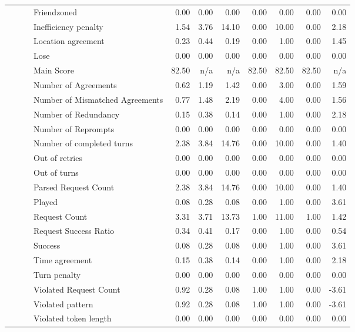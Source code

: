 \begin{tabular}{llllrrrrrrr}
 &  &  & Friendzoned & 0.00 & 0.00 & 0.00 & 0.00 & 0.00 & 0.00 & 0.00 \\
 &  &  & Inefficiency penalty & 1.54 & 3.76 & 14.10 & 0.00 & 10.00 & 0.00 & 2.18 \\
 &  &  & Location agreement & 0.23 & 0.44 & 0.19 & 0.00 & 1.00 & 0.00 & 1.45 \\
 &  &  & Lose & 0.00 & 0.00 & 0.00 & 0.00 & 0.00 & 0.00 & 0.00 \\
 &  &  & Main Score & 82.50 & n/a & n/a & 82.50 & 82.50 & 82.50 & n/a \\
 &  &  & Number of Agreements & 0.62 & 1.19 & 1.42 & 0.00 & 3.00 & 0.00 & 1.59 \\
 &  &  & Number of Mismatched Agreements & 0.77 & 1.48 & 2.19 & 0.00 & 4.00 & 0.00 & 1.56 \\
 &  &  & Number of Redundancy & 0.15 & 0.38 & 0.14 & 0.00 & 1.00 & 0.00 & 2.18 \\
 &  &  & Number of Reprompts & 0.00 & 0.00 & 0.00 & 0.00 & 0.00 & 0.00 & 0.00 \\
 &  &  & Number of completed turns & 2.38 & 3.84 & 14.76 & 0.00 & 10.00 & 0.00 & 1.40 \\
 &  &  & Out of retries & 0.00 & 0.00 & 0.00 & 0.00 & 0.00 & 0.00 & 0.00 \\
 &  &  & Out of turns & 0.00 & 0.00 & 0.00 & 0.00 & 0.00 & 0.00 & 0.00 \\
 &  &  & Parsed Request Count & 2.38 & 3.84 & 14.76 & 0.00 & 10.00 & 0.00 & 1.40 \\
 &  &  & Played & 0.08 & 0.28 & 0.08 & 0.00 & 1.00 & 0.00 & 3.61 \\
 &  &  & Request Count & 3.31 & 3.71 & 13.73 & 1.00 & 11.00 & 1.00 & 1.42 \\
 &  &  & Request Success Ratio & 0.34 & 0.41 & 0.17 & 0.00 & 1.00 & 0.00 & 0.54 \\
 &  &  & Success & 0.08 & 0.28 & 0.08 & 0.00 & 1.00 & 0.00 & 3.61 \\
 &  &  & Time agreement & 0.15 & 0.38 & 0.14 & 0.00 & 1.00 & 0.00 & 2.18 \\
 &  &  & Turn penalty & 0.00 & 0.00 & 0.00 & 0.00 & 0.00 & 0.00 & 0.00 \\
 &  &  & Violated Request Count & 0.92 & 0.28 & 0.08 & 1.00 & 1.00 & 0.00 & -3.61 \\
 &  &  & Violated pattern & 0.92 & 0.28 & 0.08 & 1.00 & 1.00 & 0.00 & -3.61 \\
 &  &  & Violated token length & 0.00 & 0.00 & 0.00 & 0.00 & 0.00 & 0.00 & 0.00 \\

\end{tabular}
